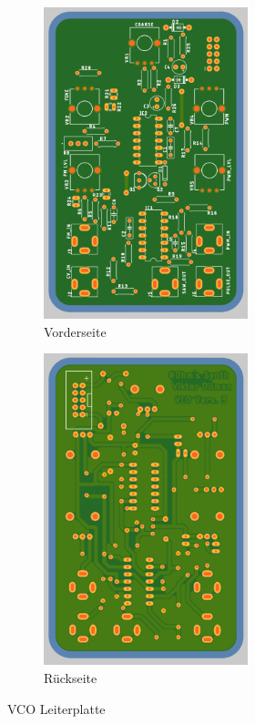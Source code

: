 \begin{figure}[h]
	\centering
	\begin{subfigure}{.5\textwidth}
		\centering
		\includegraphics[width=0.65\textwidth]{figures/VCO_Rendering_Front}
		\caption{Vorderseite}
		\label{fig:VCO_Front}
	\end{subfigure}%
	\begin{subfigure}{.5\textwidth}
		\centering
		\includegraphics[width=0.65\textwidth]{figures/VCO_Rendering_Back}
		\caption{Rückseite}
		\label{fig:VCO_Back}
	\end{subfigure}
	\caption{VCO Leiterplatte}
	\label{fig:VCO Leiterplatte}
\end{figure}



